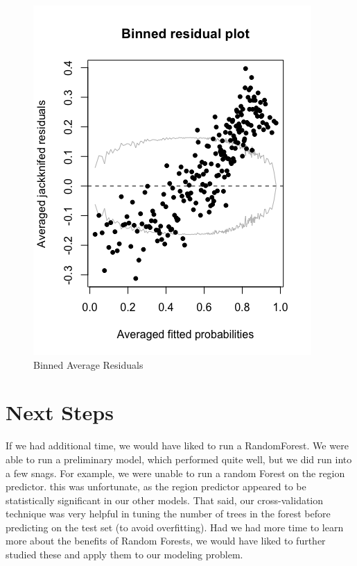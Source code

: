 \documentclass[11pt, oneside]{article}   	%
\begin{document}
\FloatBarrier
  \begin{figure}[!ht]
    \centering
    \includegraphics[scale=.5]{pp22.png}
    \caption{Binned Average Residuals}
  \end{figure}
  \FloatBarrier

\section*{Next Steps}
If we had additional time, we would have liked to run a RandomForest. We were able to run a preliminary model, which performed quite well, but we did run into a few snags. For example, we were unable to run a random Forest on the region predictor. this was unfortunate, as the region predictor appeared to be statistically significant in our other models. That said, our cross-validation technique was very helpful in tuning the number of trees in the forest before predicting on the test set (to avoid overfitting). Had we had more time to learn more about the benefits of Random Forests, we would have liked to further studied these and apply them to our modeling problem.
\end{document}
